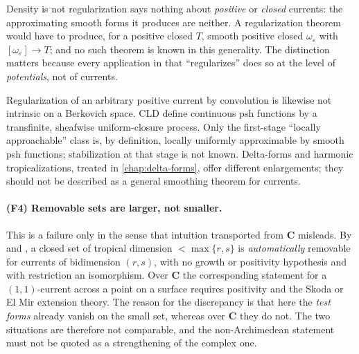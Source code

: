 \begin{warning}{Density is not regularization}
 says nothing about \emph{positive} or
\emph{closed} currents: the approximating smooth forms it produces are
neither.  A regularization theorem would have to produce, for a positive
closed $T$, smooth positive closed $\omega_\varepsilon$ with
$[\omega_\varepsilon]\to T$; and no such theorem is known in this
generality.  The distinction matters because every application in
 that ``regularizes'' does so at the level of
\emph{potentials}, not of currents.
\end{warning}

Regularization of an arbitrary positive current by convolution is likewise
not intrinsic on a Berkovich space.  CLD define continuous psh functions by
a transfinite, sheafwise uniform-closure process.  Only the first-stage
``locally approachable'' class is, by definition, locally uniformly
approximable by smooth psh functions; stabilization at that stage is not
known.  Delta-forms and harmonic tropicalizations, treated in
\cref{chap:delta-forms},
offer different enlargements; they should not be described as a general
smoothing theorem for currents.

\paragraph{(F4) Removable sets are larger, not smaller.}
This is a failure only in the sense that intuition transported from
$\mathbf C$ misleads.  By  and
, a closed set of tropical dimension
$<\max\{r,s\}$ is \emph{automatically} removable for currents of bidimension
$(r,s)$, with no growth or positivity hypothesis and with restriction an
isomorphism.  Over $\mathbf C$ the corresponding statement for a
$(1,1)$-current across a point on a surface requires positivity and the Skoda
or El Mir extension theory.  The reason for the discrepancy is that here the
\emph{test forms} already vanish on the small set, whereas over $\mathbf C$
they do not.  The two situations are therefore not comparable, and the
non-Archimedean statement must not be quoted as a strengthening of the
complex one.

